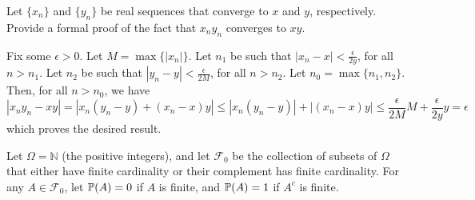 \documentclass[a4paper, 12pt, answers]{exam}
\begin{document}
\begin{questions}
  
  

  \question 
\begin{solution}
\end{solution}
 \question
 Let $\{x_n\}$ and $\{y_n\}$ be real sequences that converge to $x$ and $y$, respectively. Provide a formal proof of the fact that $x_ny_n$ converges to $xy$.
 \begin{solution}
 Fix some $\epsilon > 0$. Let $M=\max\{|x_n|\}$. Let $n_1$ be such that $|x_n-x| < \frac{\epsilon}{2y}$, for all $n>n_1$. Let $n_2$ be such that $|y_n-y| < \frac{\epsilon}{2M}$, for all $n>n_2$. Let $n_0 =\max\{n_1, n_2\}$. Then, for all $n>n_0$, we have
\begin{equation*}
|x_n y_n-xy| =|x_n(y_n-y)+(x_n-x)y|\le |x_n(y_n-y)|+ |(x_n-x)y| \le \frac{\epsilon}{2M}M+\frac{\epsilon}{2y}y= \epsilon
\end{equation*}
which proves the desired result.
 \end{solution}
 \question
 Let $\Omega=\mathbb{N}$ (the positive integers), and let $\mathcal{F}_0$ be the collection of subsets of $\Omega$ that either have finite cardinality or their complement has finite cardinality. For any $A \in \mathcal{F}_0$, let $\operatorname{\mathbb{P}}(A)=0$ if $A$ is finite, and $\operatorname{\mathbb{P}}(A)=1$ if $A^c$ is finite.
 \begin{parts}

\end{parts}
\end{questions}
\end{document}
